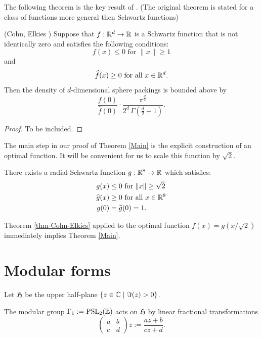 The following theorem is the key result of \cite{ElkiesCohn}. (The original theorem is stated for a   class of functions more general then Schwartz functions)
\begin{theorem}\label{thm-Cohn-Elkies}\notready
(Cohn, Elkies \cite{ElkiesCohn}) Suppose that  $f:\mathbb{R}^d\to\mathbb{R}$ is a Schwartz function that is not identically zero and satisfies the following conditions:
\begin{equation}\label{eqn-Cohn-Elkies-condition-1}f(x)\leq 0\mbox{ for } \|x\|\geq 1\end{equation} and
\begin{equation}\label{eqn-Cohn-Elkies-condition-2}\widehat{f}(x)\geq0\mbox{ for all } x\in\mathbb{R}^d.\end{equation}
  Then the density of $d$-dimensional
  sphere packings is bounded above by $$\frac{f(0)}{\widehat{f}(0)}\cdot \frac{\pi^{\frac{d}{2}}}{2^d\,\Gamma(\textstyle \frac{d}{2}+1)}.$$
\end{theorem}
\begin{proof}
To be included.
\end{proof}

The main step in our proof of Theorem \ref{Main} is the explicit  construction of an optimal function. It will be convenient for us to scale this function by $\sqrt{2}$.
\begin{theorem}\label{thm-g}
There exists a radial Schwartz function $g:\mathbb{R}^8\to\mathbb{R}$ which satisfies:
\begin{align}
g(x)&\leq 0\mbox{ for } \|x\|\geq \sqrt{2} \label{eqn-g1}\\
\widehat{g}(x)&\geq0\mbox{ for all } x\in\mathbb{R}^8\label{eqn-g2}\\
g(0)&=\widehat{g}(0)=1.\label{eqn-g3}
\end{align}
\end{theorem}
Theorem \ref{thm-Cohn-Elkies} applied to the optimal function $f(x)=g(x/\sqrt{2})$ immediately implies Theorem \ref{Main}.


\section{Modular forms}  %

Let $\mathfrak{H}$ be the upper half-plane $\{z\in\mathbb{C}\mid\Im(z)>0\}$.
\begin{lemma}\label{def-Gamma-1-Action}
    The modular group $\Gamma_1:=\mathrm{PSL}_2(\mathbb{Z})$ acts on $\mathfrak{H}$ by linear fractional transformations
$$\left(\begin{smallmatrix}a&b\\c&d\end{smallmatrix}\right)z:=\frac{az+b}{cz+d}.$$
\end{lemma}

